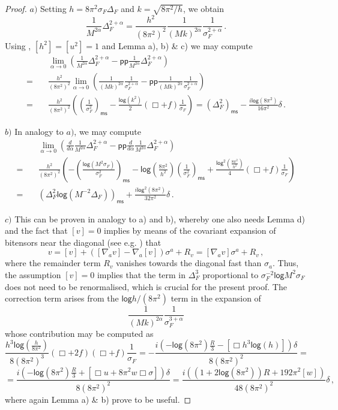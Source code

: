 \documentclass[11pt]{book}
\newcommand{\pp}{\mathsf{pp}}
\newcommand{\ms}{\mathsf{ms}}
\renewcommand{\log}{\mathsf{log}}
\theoremstyle{break}
\begin{document}
\begin{proof}



$a)$ Setting $h=8\pi^2\sigma_F \Delta_F$ and $k=\sqrt{8\pi^2/h}$, we obtain
%
$$\frac{1}{M^{2\alpha}}\Delta_F^{2+\alpha}=\frac{h^2}{(8\pi^2)^2}\frac{1}{(Mk)^{2\alpha}}\frac{1}{\sigma_F^{2+\alpha}}\,.$$ 
%
Using %
, $[h^2]=[u^2]=1$ and Lemma %
a), b) \& c) we may compute
%
\begin{align*}&\lim_{\alpha\to 0}\left(\frac{1}{M^{2\alpha}}\Delta_F^{2+\alpha}-\pp\frac{1}{M^{2\alpha}}\Delta_F^{2+\alpha}\right)\\
%
=\quad&\frac{h^2}{(8\pi^2)^2}\lim_{\alpha\to 0}\left(\frac{1}{(Mk)^{2\alpha}}\frac{1}{\sigma_F^{2+\alpha}}-\pp\frac{1}{(Mk)^{2\alpha}}\frac{1}{\sigma_F^{2+\alpha}}\right)\\
%
=\quad&\frac{h^2}{(8\pi^2)^2} \left(\left(\frac{1}{\sigma^2_F}\right)_\ms-\frac{\log (k^2)}{2}\left(\Box + f\right)\frac{1}{\sigma_F}\right)=(\Delta^2_F)_\ms-\frac{i\log(8\pi^2)}{16\pi^2}\delta\,.\end{align*}

$b)$ In analogy to $a)$, we may compute
%
\begin{align*}&\lim_{\alpha\to 0}\left(\frac{d}{d\alpha}\frac{1}{M^{2\alpha}}\Delta_F^{2+\alpha}-\pp\frac{d}{d\alpha}\frac{1}{M^{2\alpha}}\Delta_F^{2+\alpha}\right)\\
%
=\quad&\frac{h^2}{(8\pi^2)^2} \left(-\left(\frac{\log \left(M^2 \sigma_F\right)}{\sigma^2_F}\right)_\ms-\log\left(\frac{8\pi^2}{h^2}\right)\left(\frac{1}{\sigma^2_F}\right)_\ms+\frac{\log^2 \left(\frac{8\pi^2}{h^2}\right)}{4}\left(\Box + f\right)\frac{1}{\sigma_F}\right)\\
%
=\quad &\left(\Delta^2_F\log \left(M^{-2}\Delta_F\right)\right)_\ms+\frac{i\log^2(8\pi^2)}{32\pi^2}\delta\,.\end{align*}
 
$c)$ This can be proven in analogy to a) and b), whereby one also needs Lemma %
d) and the fact that $[v]=0$ implies by means of the covariant expansion of bitensors near the diagonal (see e.g. %
) that 
$$v=[v]+([\nabla_a v]-\nabla_a[v])\sigma^a+R_v=[\nabla_a v]\sigma^a+R_v\,,$$
where the remainder term $R_v$ vanishes towards the diagonal fast than $\sigma_a$. Thus, the assumption $[v]=0$ implies that the term in $\Delta^3_F$ proportional to $\sigma^{-2}_F \log M^2\sigma_F$ does not need to be renormalised, which is crucial for the present proof. The correction term arises from the  $\log h/(8\pi^2)$ term in the expansion of $$\frac{1}{(Mk)^{2\alpha}}\frac{1}{\sigma_F^{3+\alpha}}$$ whose contribution may be computed as
%
$$\frac{h^3 \log\left( \frac{h}{8\pi^2}\right)}{8(8\pi^2)^3}(\Box+2f)(\Box+f)\frac{1}{\sigma_F}=-\frac{i\left(-\log(8\pi^2)\frac{R}{3}-[\Box h^3 \log (h)]\right)\delta}{8(8\pi^2)^2}=$$
%
$$=\frac{i\left(-\log(8\pi^2)\frac{R}{3}+[\Box u + 8\pi^2 w\Box \sigma]\right)\delta}{8(8\pi^2)^2}=\frac{i\left((1+2\log(8\pi^2))R+192\pi^2[w]\right)}{48(8\pi^2)^2}\delta\,,$$
%
where again Lemma %
a) \& b) prove to be  useful.





\end{proof}
\end{document}
